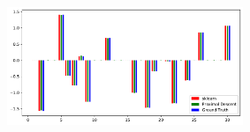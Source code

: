 \documentclass[12pt,twoside]{article}
\begin{document}
\begin{enumerate}
\begin{enumerate}
    	\begin{figure}[H]
		\centering
		\captionsetup{justification=centering}
		\includegraphics[width=200pt]{code/pgd/compare_models.pdf}
	\end{figure}

 \end{enumerate}
 

 \end{enumerate}
\end{document}
